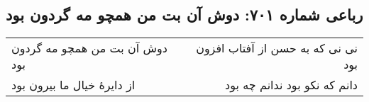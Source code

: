 \begin{center}
\section*{رباعی شماره ۷۰۱: دوش آن بت من همچو مه گردون بود}
\label{sec:0701}
\begin{longtable}{l p{0.5cm} r}
دوش آن بت من همچو مه گردون بود
&&
نی نی که به حسن از آفتاب افزون بود
\\
از دایرهٔ خیال ما بیرون بود
&&
دانم که نکو بود ندانم چه بود
\\
\end{longtable}
\end{center}
